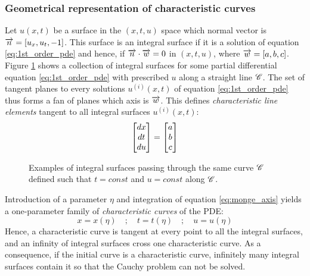 \subsubsection*{Geometrical representation of characteristic curves}
Let $u(x,t)$ be a surface in the $(x,t,u)$ space which normal vector is ${\overrightarrow{n}}=[u_x,u_t,-1]$. This surface is an integral surface if it is a solution of equation \eqref{eq:1st_order_pde} and hence, if ${\overrightarrow{n}}\cdot {\overrightarrow{w}}=0$ in $(x,t,u)$, where ${\overrightarrow{w}}=[a,b,c]$.
Figure \ref{fig:plan_fan} shows a collection of integral surfaces for some partial differential equation \eqref{eq:1st_order_pde} with prescribed $u$ along a straight line $\mathscr{C}$. The set of tangent planes to every solutions $u^{(i)}(x,t)$ of equation \eqref{eq:1st_order_pde} thus forms a fan of planes which axis is ${\overrightarrow{w}}$.
This defines \textit{characteristic line elements} tangent to all integral surfaces $u^{(i)}(x,t)$:
\begin{equation}
  \label{eq:monge_axis}
  \left[\begin{matrix}dx \\ dt \\ du\end{matrix}\right] = \left[\begin{matrix}a \\ b \\c\end{matrix}\right]
\end{equation}
\begin{figure}[h!]
  \centering
  
  \caption{Examples of integral surfaces passing through the same curve $\mathscr{C}$ defined such that $t=const$ and $u=const$ along $\mathscr{C}$.}
  \label{fig:plan_fan}
\end{figure}
Introduction of a parameter $\eta$ and integration of equation \eqref{eq:monge_axis} yields a one-parameter family of \textit{characteristic curves} of the PDE:
\begin{equation*}
  x=x(\eta) \quad ; \quad t=t(\eta) \quad ; \quad u=u(\eta)
\end{equation*}
Hence, a characteristic curve is tangent at every point to all the integral surfaces, and an infinity of integral surfaces cross one characteristic curve. As a consequence, if the initial curve is a characteristic curve, infinitely many integral surfaces contain it so that the Cauchy problem can not be solved.


